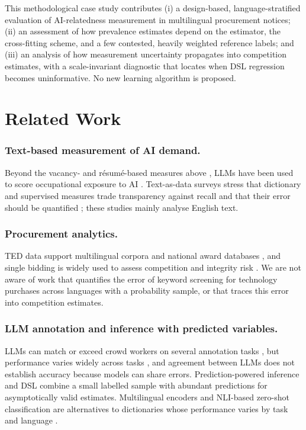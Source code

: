 \documentclass[runningheads]{llncs}
\begin{document}
This methodological case study contributes (i) a design-based, language-stratified evaluation of AI-relatedness measurement in multilingual procurement notices; (ii) an assessment of how prevalence estimates depend on the estimator, the cross-fitting scheme, and a few contested, heavily weighted reference labels; and (iii) an analysis of how measurement uncertainty propagates into competition estimates, with a scale-invariant diagnostic that locates when DSL regression becomes uninformative. No new learning algorithm is proposed.

\section{Related Work}
\subsubsection{Text-based measurement of AI demand.} Beyond the vacancy- and r\'esum\'e-based measures above \cite{acemoglu2022,babina2024}, LLMs have been used to score occupational exposure to AI \cite{eloundou2024}. Text-as-data surveys stress that dictionary and supervised measures trade transparency against recall and that their error should be quantified \cite{gentzkow2019}; these studies mainly analyse English text.

\subsubsection{Procurement analytics.} TED data support multilingual corpora \cite{ahmia2018} and national award databases \cite{potin2023}, and single bidding is widely used to assess competition and integrity risk \cite{fazekas2016,decarolis2022}. We are not aware of work that quantifies the error of keyword screening for technology purchases across languages with a probability sample, or that traces this error into competition estimates.

\subsubsection{LLM annotation and inference with predicted variables.} LLMs can match or exceed crowd workers on several annotation tasks \cite{gilardi2023}, but performance varies widely across tasks \cite{ziems2024}, and agreement between LLMs does not establish accuracy because models can share errors. Prediction-powered inference \cite{angelopoulos2023} and DSL \cite{egami2023} combine a small labelled sample with abundant predictions for asymptotically valid estimates. Multilingual encoders \cite{wang2024me5,reimers2020} and NLI-based zero-shot classification \cite{yin2019,he2023} are alternatives to dictionaries whose performance varies by task and language \cite{muennighoff2023}.
\end{document}
